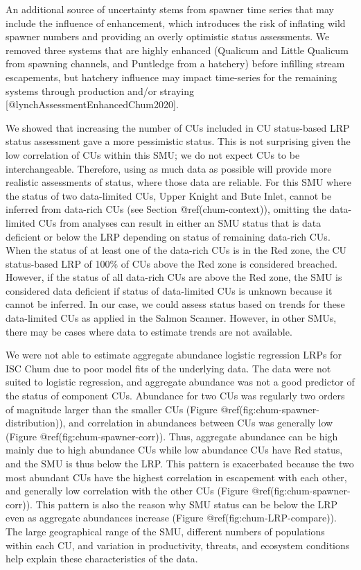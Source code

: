 \documentclass[
]{article}
\begin{document}
An additional source of uncertainty stems from spawner time series that
may include the influence of enhancement, which introduces the risk of
inflating wild spawner numbers and providing an overly optimistic status
assessments. We removed three systems that are highly enhanced (Qualicum
and Little Qualicum from spawning channels, and Puntledge from a
hatchery) before infilling stream escapements, but hatchery influence
may impact time-series for the remaining systems through production
and/or straying {[}@lynchAssessmentEnhancedChum2020{]}.

We showed that increasing the number of CUs included in CU status-based
LRP status assessment gave a more pessimistic status. This is not
surprising given the low correlation of CUs within this SMU; we do not
expect CUs to be interchangeable. Therefore, using as much data as
possible will provide more realistic assessments of status, where those
data are reliable. For this SMU where the status of two data-limited
CUs, Upper Knight and Bute Inlet, cannot be inferred from data-rich CUs
(see Section @ref(chum-context)), omitting the data-limited CUs from
analyses can result in either an SMU status that is data deficient or
below the LRP depending on status of remaining data-rich CUs. When the
status of at least one of the data-rich CUs is in the Red zone, the CU
status-based LRP of 100\% of CUs above the Red zone is considered
breached. However, if the status of all data-rich CUs are above the Red
zone, the SMU is considered data deficient if status of data-limited CUs
is unknown because it cannot be inferred. In our case, we could assess
status based on trends for these data-limited CUs as applied in the
Salmon Scanner. However, in other SMUs, there may be cases where data to
estimate trends are not available.

We were not able to estimate aggregate abundance logistic regression
LRPs for ISC Chum due to poor model fits of the underlying data. The
data were not suited to logistic regression, and aggregate abundance was
not a good predictor of the status of component CUs. Abundance for two
CUs was regularly two orders of magnitude larger than the smaller CUs
(Figure @ref(fig:chum-spawner-distribution)), and correlation in
abundances between CUs was generally low (Figure
@ref(fig:chum-spawner-corr)). Thus, aggregate abundance can be high
mainly due to high abundance CUs while low abundance CUs have Red
status, and the SMU is thus below the LRP. This pattern is exacerbated
because the two most abundant CUs have the highest correlation in
escapement with each other, and generally low correlation with the other
CUs (Figure @ref(fig:chum-spawner-corr)). This pattern is also the
reason why SMU status can be below the LRP even as aggregate abundances
increase (Figure @ref(fig:chum-LRP-compare)). The large geographical
range of the SMU, different numbers of populations within each CU, and
variation in productivity, threats, and ecosystem conditions help
explain these characteristics of the data.
\end{document}
